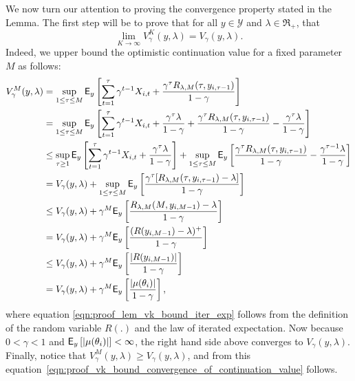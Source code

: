 \begin{myproof}[Proof.]
	We now turn our attention to proving the convergence property stated in the Lemma. The first step will be to prove that for all $y \in \mathcal{Y}$ and $\lambda \in \Re_+$, that 
	\begin{equation} \label{eqn:proof_vk_bound_convergence_of_continuation_value}
	\lim_{K \to \infty}V^K_\gamma(y, \lambda) = V_\gamma(y, \lambda).
	\end{equation}
	Indeed, we upper bound the optimistic continuation value for a fixed parameter $M$ as follows:
	\begin{align}
		V^M_\gamma(y, \lambda) & = \sup_{1 \le \tau \le M} \mathsf{E}_y\left[\sum_{t=1}^{\tau} \gamma^{t-1} X_{i,t} + \frac{\gamma^{\tau}R_{\lambda,M}(\tau, y_{i,\tau-1})}{1-\gamma}\right] \nonumber\\
		& = \sup_{1 \le \tau \le M} \mathsf{E}_y\left[\sum_{t=1}^{\tau} \gamma^{t-1} X_{i,t} + \frac{\gamma^{\tau}\lambda}{1-\gamma} + \frac{\gamma^{\tau}R_{\lambda,M}(\tau, y_{i,\tau-1})}{1-\gamma} - \frac{\gamma^{\tau}\lambda}{1-\gamma}\right] \nonumber \\
		& \le \sup_{\tau \ge 1} \mathsf{E}_y\left[\sum_{t=1}^{\tau } \gamma^{t-1} X_{i,t} + \frac{\gamma^{\tau}\lambda}{1-\gamma}\right] + \sup_{1 \le \tau \le M}\mathsf{E}_y\left[\frac{\gamma^{\tau}R_{\lambda,M}(\tau, y_{i,\tau-1})}{1-\gamma} - \frac{\gamma^{\tau -1}\lambda}{1-\gamma}\right] \nonumber \\
		& =V_{\gamma}(y, \lambda) + \sup_{1 \le \tau \le M}\mathsf{E}_y\left[\frac{\gamma^{\tau}[R_{\lambda,M}(\tau, y_{i,\tau-1})-\lambda]}{1-\gamma}\right] \nonumber \\
		& \le V_{\gamma}(y, \lambda)  + \gamma^{M}\mathsf{E}_y\left[\frac{R_{\lambda,M}(M, y_{i,M-1})-\lambda}{1-\gamma}\right] \nonumber \\
		& = V_{\gamma}(y, \lambda)  + \gamma^{M}\mathsf{E}_y\left[\frac{( R(y_{i,M-1}) - \lambda)^+}{1-\gamma}\right] \nonumber \\
		& \le V_{\gamma}(y, \lambda)  + \gamma^{M}\mathsf{E}_y\left[\frac{|R(y_{i,M-1})|}{1-\gamma}\right] \nonumber  \\
		& = V_{\gamma}(y, \lambda)  + \gamma^M \mathsf{E}_y\left[\frac{|\mu(\theta_i)|}{1-\gamma}\right] \label{eqn:proof_lem_vk_bound_iter_exp},
	\end{align}
	where equation \eqref{eqn:proof_lem_vk_bound_iter_exp} follows from the definition of the random variable $R(.)$ and the law of iterated expectation. Now because $0 < \gamma < 1$ and $\mathsf{E}_y\left[|\mu(\theta_i)|\right] < \infty$, the right hand side above converges to $V_{\gamma}(y, \lambda)$. Finally, notice that $V^M_\gamma(y, \lambda) \ge V_\gamma(y, \lambda)$, and from this equation~\eqref{eqn:proof_vk_bound_convergence_of_continuation_value} follows. 
	

\end{myproof}
